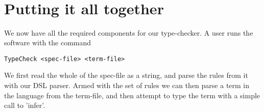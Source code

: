 {\begin{code}
\AgdaSpace{}%
\AgdaSymbol{\#-\}}\<%
\\
%
\>[2]\AgdaSpace{}%
\AgdaSpace{}%
\AgdaSymbol{=}\AgdaSpace{}%
%
\>[793I]\AgdaSymbol{(}\AgdaSpace{}%
\AgdaSymbol{(}\AgdaSpace{}%
\AgdaSymbol{)}\AgdaSpace{}%
\<%
\\
\>[793I][@{}l@{\AgdaIndent{0}}]%
\>[37]\AgdaSpace{}%
\AgdaSymbol{(}\AgdaSpace{}%
\AgdaSymbol{)}\AgdaSpace{}%
\<%
\\
%
\>[37]\AgdaSpace{}%
\AgdaSpace{}%
\<%
\\
%
\>[37]\AgdaInductiveConstructor{[]}\AgdaSymbol{)}\<%
\end{code}
}
\section{Putting it all together}
We now have all the required components for our type-checker. A user runs the software
with the command \begin{verbatim}TypeCheck <spec-file> <term-file>\end{verbatim}We
first read the whole of the spec-file as a string, and parse the rules from it with
our DSL parser. Armed with the set of rules we can then parse a term in the language
from the term-file, and then attempt to type the term with a simple call to 'infer'.
